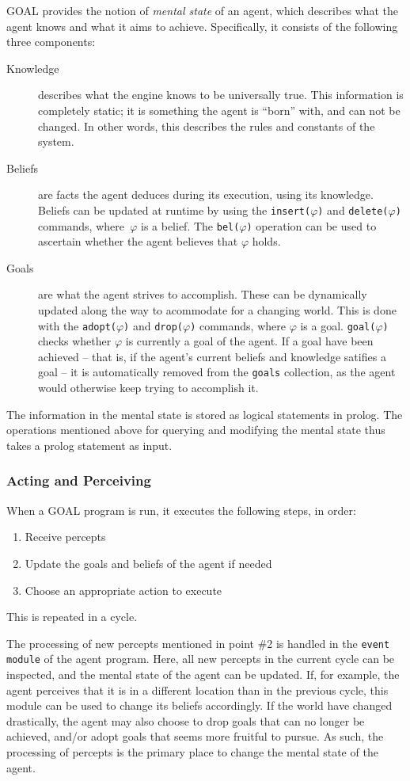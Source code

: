GOAL provides the notion of \emph{mental state} of an agent, which
describes what the agent knows and what it aims to achieve. Specifically,
it consists of the following three components:
\begin{description}
\item [{Knowledge}] describes what the engine knows to be universally true.
This information is completely static; it is something the agent is
``born'' with, and can not be changed. In other words, this describes
the rules and constants of the system.
\item [{Beliefs}] are facts the agent deduces during its execution, using
its knowledge. Beliefs can be updated at runtime by using the \texttt{insert($\varphi$)}
and \texttt{delete($\varphi$)} commands, where\texttt{ $\varphi$}
is a belief. The \texttt{bel($\varphi$)} operation can be used to
ascertain whether the agent believes that $\varphi$ holds.
\item [{Goals}] are what the agent strives to accomplish. These can be
dynamically updated along the way to acommodate for a changing world.
This is done with the \texttt{adopt($\varphi$)} and \texttt{drop($\varphi$)}
commands, where $\varphi$ is a goal. \texttt{goal($\varphi$)} checks
whether $\varphi$ is currently a goal of the agent. If a goal have
been achieved -- that is, if the agent's current beliefs and knowledge
satifies a goal -- it is automatically removed from the \texttt{goals}
collection, as the agent would otherwise keep trying to accomplish
it. 
\end{description}
The information in the mental state is stored as logical statements
in prolog. The operations mentioned above for querying and modifying
the mental state thus takes a prolog statement as input.


\subsubsection*{Acting and Perceiving}

When a GOAL program is run, it executes the following steps, in order:
\begin{enumerate}
\item Receive percepts
\item Update the goals and beliefs of the agent if needed
\item Choose an appropriate action to execute
\end{enumerate}
This is repeated in a cycle. 

The processing of new percepts mentioned in point \#2 is handled in
the \texttt{event module} of the agent program. Here, all new percepts
in the current cycle can be inspected, and the mental state of the
agent can be updated. If, for example, the agent perceives that it
is in a different location than in the previous cycle, this module
can be used to change its beliefs accordingly. If the world have changed
drastically, the agent may also choose to drop goals that can no longer
be achieved, and/or adopt goals that seems more fruitful to pursue.
As such, the processing of percepts is the primary place to change
the mental state of the agent.

